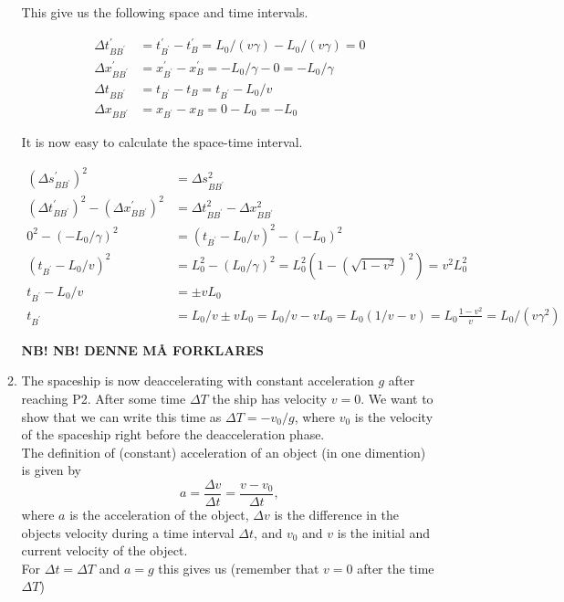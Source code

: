 \documentclass[a4paper,10pt,english]{article}
\begin{document}
\begin{enumerate}
\begin{enumerate}
This give us the following space and time intervals.

\begin{align*}
\Delta t^{\prime}_{BB^{\prime}}&=t^{\prime}_{B^{\prime}}-t^{\prime}_{B}=L_{0}/(v\gamma)-L_{0}/(v\gamma)=0\\
\Delta x^{\prime}_{BB^{\prime}}&=x^{\prime}_{B^{\prime}}-x^{\prime}_{B}=-L_{0}/\gamma-0=-L_{0}/\gamma\\
\Delta t_{BB^{\prime}}&=t_{B^{\prime}}-t_{B}=t_{B^{\prime}}-L_{0}/v\\
\Delta x_{BB^{\prime}}&=x_{B^{\prime}}-x_{B}=0-L_{0}=-L_{0}
\end{align*}

It is now easy to calculate the space-time interval.

\begin{align*}
(\Delta s^{\prime}_{BB^{\prime}})^{2}&=\Delta s_{BB^{\prime}}^{2}\\
(\Delta t^{\prime}_{BB^{\prime}})^{2}-(\Delta x^{\prime}_{BB^{\prime}})^{2}&=\Delta t_{BB^{\prime}}^{2}-\Delta x_{BB^{\prime}}^{2}\\
0^{2}-(-L_{0}/\gamma)^{2}&=(t_{B^{\prime}}-L_{0}/v)^{2}-(-L_{0})^{2}\\
(t_{B^{\prime}}-L_{0}/v)^{2}&=L_{0}^{2}-(L_{0}/\gamma)^{2}=L_{0}^{2}\left(1-\left(\sqrt{1-v^{2}}\right)^{2}\right)=v^{2}L_{0}^{2}\\
t_{B^{\prime}}-L_{0}/v&=\pm vL_{0}\\
t_{B^{\prime}}&=L_{0}/v\pm vL_{0}=L_{0}/v-vL_{0}=L_{0}(1/v-v)=L_{0}\frac{1-v^{2}}{v}=L_{0}/(v\gamma^{2})
\end{align*}

\textbf{NB! NB! DENNE MÅ FORKLARES}

\item The spaceship is now deaccelerating with constant acceleration $g$ after reaching P2. After some time $\Delta T$ the ship has velocity $v=0$. We want to show that we can write this time as $\Delta T=-v_{0}/g$, where $v_{0}$ is the velocity of the spaceship right before the deacceleration phase.
\\
The definition of (constant) acceleration of an object (in one dimention) is given by \begin{equation}\label{eq:def_acc}a=\frac{\Delta v}{\Delta t}=\frac{v-v_{0}}{\Delta t},\end{equation} where $a$ is the acceleration of the object, $\Delta v$ is the difference in the objects velocity during a time interval $\Delta t$, and $v_{0}$ and $v$ is the initial and current velocity of the object.
\\
For $\Delta t=\Delta T$ and $a=g$ this gives us (remember that $v=0$ after the time $\Delta T$)


\end{enumerate}
\end{enumerate}
\end{document}
